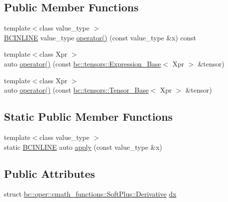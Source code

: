 \subsection*{Public Member Functions}
\begin{DoxyCompactItemize}
\item 
{\footnotesize template$<$class value\+\_\+type $>$ }\\\hyperlink{common_8h_a6699e8b0449da5c0fafb878e59c1d4b1}{B\+C\+I\+N\+L\+I\+NE} value\+\_\+type \hyperlink{structbc_1_1oper_1_1cmath__functions_1_1SoftPlus_a67304a52beda6809fff9c80531f2cdaa}{operator()} (const value\+\_\+type \&x) const
\item 
{\footnotesize template$<$class Xpr $>$ }\\auto \hyperlink{structbc_1_1oper_1_1cmath__functions_1_1SoftPlus_a2a0fda0e90b138ba09e65f04f3623857}{operator()} (const \hyperlink{classbc_1_1tensors_1_1Expression__Base}{bc\+::tensors\+::\+Expression\+\_\+\+Base}$<$ Xpr $>$ \&tensor)
\item 
{\footnotesize template$<$class Xpr $>$ }\\auto \hyperlink{structbc_1_1oper_1_1cmath__functions_1_1SoftPlus_a35ca1dd19e3c473788fe86c6fa4ea70d}{operator()} (const \hyperlink{classbc_1_1tensors_1_1Tensor__Base}{bc\+::tensors\+::\+Tensor\+\_\+\+Base}$<$ Xpr $>$ \&tensor)
\end{DoxyCompactItemize}
\subsection*{Static Public Member Functions}
\begin{DoxyCompactItemize}
\item 
{\footnotesize template$<$class value\+\_\+type $>$ }\\static \hyperlink{common_8h_a6699e8b0449da5c0fafb878e59c1d4b1}{B\+C\+I\+N\+L\+I\+NE} auto \hyperlink{structbc_1_1oper_1_1cmath__functions_1_1SoftPlus_a3cfff07d94db18c13e4353eadfaf2d33}{apply} (const value\+\_\+type \&x)
\end{DoxyCompactItemize}
\subsection*{Public Attributes}
\begin{DoxyCompactItemize}
\item 
struct \hyperlink{structbc_1_1oper_1_1cmath__functions_1_1SoftPlus_1_1Derivative}{bc\+::oper\+::cmath\+\_\+functions\+::\+Soft\+Plus\+::\+Derivative} \hyperlink{structbc_1_1oper_1_1cmath__functions_1_1SoftPlus_a5e3493e68ebcc9b7bc79a50e4d65f40d}{dx}
\end{DoxyCompactItemize}


